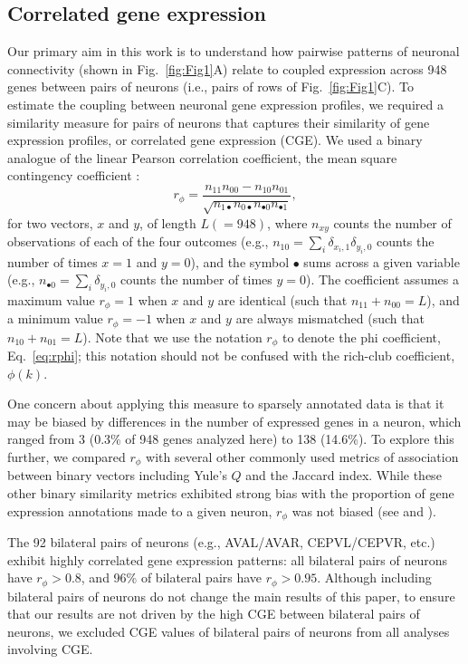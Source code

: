 \documentclass[10pt,letterpaper]{article}
\begin{document}
\subsection*{Correlated gene expression}
Our primary aim in this work is to understand how pairwise patterns of neuronal connectivity (shown in Fig.~\ref{fig:Fig1}A) relate to coupled expression across 948 genes between pairs of neurons (i.e., pairs of rows of Fig.~\ref{fig:Fig1}C).
To estimate the coupling between neuronal gene expression profiles, we required a similarity measure for pairs of neurons that captures their similarity of gene expression profiles, or correlated gene expression (CGE).
We used a binary analogue of the linear Pearson correlation coefficient, the mean square contingency coefficient \cite{Warrens2008}:
\begin{equation} \label{eq:rphi}
    r_\phi = \frac{n_{11}n_{00} - n_{10}n_{01}}{\sqrt{n_{1\bullet}n_{0\bullet}n_{\bullet 0}n_{\bullet 1}}},
\end{equation}
for two vectors, $x$ and $y$, of length $L (=948)$, where $n_{xy}$ counts the number of observations of each of the four outcomes (e.g., $n_{10} = \sum_i \delta_{x_i,1}\delta_{y_i,0}$ counts the number of times $x=1$ and $y=0$), and the symbol $\bullet$ sums across a given variable (e.g., $n_{\bullet 0} = \sum_i \delta_{y_i,0}$ counts the number of times $y = 0$).
The coefficient assumes a maximum value $r_\phi = 1$ when $x$ and $y$ are identical (such that $n_{11} + n_{00} = L$), and a minimum value $r_\phi = -1$ when $x$ and $y$ are always mismatched (such that $n_{10} + n_{01} = L$).
Note that we use the notation $r_\phi$ to denote the phi coefficient, Eq.~\eqref{eq:rphi}; this notation should not be confused with the rich-club coefficient, $\phi(k)$.

One concern about applying this measure to sparsely annotated data is that it may be biased by differences in the number of expressed genes in a neuron, which ranged from 3 (0.3\% of 948 genes analyzed here) to 138 (14.6\%).
To explore this further, we compared $r_\phi$ with several other commonly used metrics of association between binary vectors including Yule's $Q$ and the Jaccard index.
While these other binary similarity metrics exhibited strong bias with the proportion of gene expression annotations made to a given neuron, $r_\phi$ was not biased (see  and ).

The 92 bilateral pairs of neurons (e.g., AVAL/AVAR, CEPVL/CEPVR, etc.) exhibit highly correlated gene expression patterns: all bilateral pairs of neurons have $r_\phi > 0.8$, and 96\% of bilateral pairs have $r_\phi > 0.95$.
Although including bilateral pairs of neurons do not change the main results of this paper, to ensure that our results are not driven by the high CGE between bilateral pairs of neurons, we excluded CGE values of bilateral pairs of neurons from all analyses involving CGE.
\end{document}
